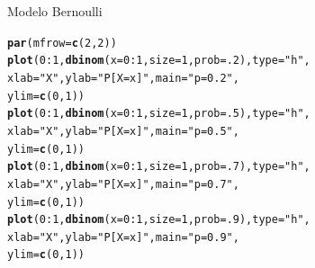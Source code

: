 \documentclass[10pt]{beamer}\usepackage[]{graphicx}\usepackage[]{color}
\makeatletter
\newcommand{\hlnum}[1]{\textcolor[rgb]{0.686,0.059,0.569}{#1}}%
\newcommand{\hlstr}[1]{\textcolor[rgb]{0.192,0.494,0.8}{#1}}%
\newcommand{\hlopt}[1]{\textcolor[rgb]{0,0,0}{#1}}%
\newcommand{\hlstd}[1]{\textcolor[rgb]{0.345,0.345,0.345}{#1}}%
\newcommand{\hlkwc}[1]{\textcolor[rgb]{0.333,0.667,0.333}{#1}}%
\newcommand{\hlkwd}[1]{\textcolor[rgb]{0.737,0.353,0.396}{\textbf{#1}}}%
\newenvironment{kframe}{%
 \def\at@end@of@kframe{}%
 \ifinner\ifhmode%
  \def\at@end@of@kframe{\end{minipage}}%
  \begin{minipage}{\columnwidth}%
 \fi\fi%
 \def\FrameCommand##1{\hskip\@totalleftmargin \hskip-\fboxsep
 \colorbox{shadecolor}{##1}\hskip-\fboxsep
     \hskip-\linewidth \hskip-\@totalleftmargin \hskip\columnwidth}%
 \MakeFramed {\advance\hsize-\width
   \@totalleftmargin\z@ \linewidth\hsize
   \@setminipage}}%
 {\par\unskip\endMakeFramed%
 \at@end@of@kframe}
\newenvironment{knitrout}{}{} %
\theoremstyle{definition}
\makeatother
\begin{document}
\begin{frame}[fragile]{Modelo Bernoulli}
\begin{knitrout}\small
{}\color{fgcolor}\begin{kframe}
\begin{alltt}
\hlkwd{par}\hlstd{(}\hlkwc{mfrow}\hlstd{=}\hlkwd{c}\hlstd{(}\hlnum{2}\hlstd{,}\hlnum{2}\hlstd{))}
\hlkwd{plot}\hlstd{(}\hlnum{0}\hlopt{:}\hlnum{1}\hlstd{,} \hlkwd{dbinom}\hlstd{(}\hlkwc{x} \hlstd{=} \hlnum{0}\hlopt{:}\hlnum{1}\hlstd{,} \hlkwc{size} \hlstd{=} \hlnum{1}\hlstd{,} \hlkwc{prob} \hlstd{=} \hlnum{.2}\hlstd{),} \hlkwc{type} \hlstd{=} \hlstr{"h"}\hlstd{,}
     \hlkwc{xlab} \hlstd{=} \hlstr{"X"}\hlstd{,} \hlkwc{ylab} \hlstd{=} \hlstr{"P[X = x]"}\hlstd{,} \hlkwc{main} \hlstd{=} \hlstr{"p = 0.2"}\hlstd{,}
     \hlkwc{ylim} \hlstd{=} \hlkwd{c}\hlstd{(}\hlnum{0}\hlstd{,}\hlnum{1}\hlstd{))}
\hlkwd{plot}\hlstd{(}\hlnum{0}\hlopt{:}\hlnum{1}\hlstd{,} \hlkwd{dbinom}\hlstd{(}\hlkwc{x} \hlstd{=} \hlnum{0}\hlopt{:}\hlnum{1}\hlstd{,} \hlkwc{size} \hlstd{=} \hlnum{1}\hlstd{,} \hlkwc{prob} \hlstd{=} \hlnum{.5}\hlstd{),} \hlkwc{type} \hlstd{=} \hlstr{"h"}\hlstd{,}
     \hlkwc{xlab} \hlstd{=} \hlstr{"X"}\hlstd{,} \hlkwc{ylab} \hlstd{=} \hlstr{"P[X = x]"}\hlstd{,} \hlkwc{main} \hlstd{=} \hlstr{"p = 0.5"}\hlstd{,}
     \hlkwc{ylim} \hlstd{=} \hlkwd{c}\hlstd{(}\hlnum{0}\hlstd{,}\hlnum{1}\hlstd{))}
\hlkwd{plot}\hlstd{(}\hlnum{0}\hlopt{:}\hlnum{1}\hlstd{,} \hlkwd{dbinom}\hlstd{(}\hlkwc{x} \hlstd{=} \hlnum{0}\hlopt{:}\hlnum{1}\hlstd{,} \hlkwc{size} \hlstd{=} \hlnum{1}\hlstd{,} \hlkwc{prob} \hlstd{=} \hlnum{.7}\hlstd{),} \hlkwc{type} \hlstd{=} \hlstr{"h"}\hlstd{,}
     \hlkwc{xlab} \hlstd{=} \hlstr{"X"}\hlstd{,} \hlkwc{ylab} \hlstd{=} \hlstr{"P[X = x]"}\hlstd{,} \hlkwc{main} \hlstd{=} \hlstr{"p = 0.7"}\hlstd{,}
     \hlkwc{ylim} \hlstd{=} \hlkwd{c}\hlstd{(}\hlnum{0}\hlstd{,}\hlnum{1}\hlstd{))}
\hlkwd{plot}\hlstd{(}\hlnum{0}\hlopt{:}\hlnum{1}\hlstd{,} \hlkwd{dbinom}\hlstd{(}\hlkwc{x} \hlstd{=} \hlnum{0}\hlopt{:}\hlnum{1}\hlstd{,} \hlkwc{size} \hlstd{=} \hlnum{1}\hlstd{,} \hlkwc{prob} \hlstd{=} \hlnum{.9}\hlstd{),} \hlkwc{type} \hlstd{=} \hlstr{"h"}\hlstd{,}
     \hlkwc{xlab} \hlstd{=} \hlstr{"X"}\hlstd{,} \hlkwc{ylab} \hlstd{=} \hlstr{"P[X = x]"}\hlstd{,} \hlkwc{main} \hlstd{=} \hlstr{"p = 0.9"}\hlstd{,}
     \hlkwc{ylim} \hlstd{=} \hlkwd{c}\hlstd{(}\hlnum{0}\hlstd{,}\hlnum{1}\hlstd{))}
\end{alltt}
\end{kframe}
\end{knitrout}
\end{frame}
\end{document}
